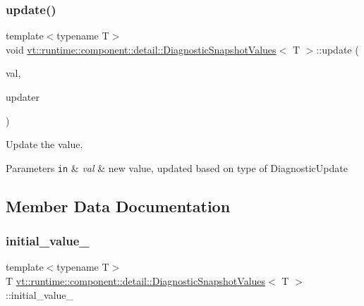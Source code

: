 \subsubsection{\texorpdfstring{update()}{update()}}
{\footnotesize\ttfamily template$<$typename T$>$ \\
void \hyperlink{structvt_1_1runtime_1_1component_1_1detail_1_1_diagnostic_snapshot_values}{vt\+::runtime\+::component\+::detail\+::\+Diagnostic\+Snapshot\+Values}$<$ T $>$\+::update (\begin{DoxyParamCaption}\item[{T}]{val,  }\item[{\hyperlink{namespacevt_1_1runtime_1_1component_a896637e6e183a909a17bfd8d3943c206}{Diagnostic\+Update}}]{updater }\end{DoxyParamCaption})\hspace{0.3cm}{\ttfamily [inline]}}



Update the value. 


\begin{DoxyParams}[1]{Parameters}
\mbox{\tt in}  & {\em val} & new value, updated based on type of {\ttfamily Diagnostic\+Update} \\
\hline
\end{DoxyParams}


\subsection{Member Data Documentation}
\mbox{\label{structvt_1_1runtime_1_1component_1_1detail_1_1_diagnostic_snapshot_values_af4817919ef8c294ce8e3e45e2f3d914d}} 
\subsubsection{\texorpdfstring{initial\+\_\+value\+\_\+}{initial\_value\_}}
{\footnotesize\ttfamily template$<$typename T$>$ \\
T \hyperlink{structvt_1_1runtime_1_1component_1_1detail_1_1_diagnostic_snapshot_values}{vt\+::runtime\+::component\+::detail\+::\+Diagnostic\+Snapshot\+Values}$<$ T $>$\+::initial\+\_\+value\+\_\+\hspace{0.3cm}{\ttfamily [protected]}}

